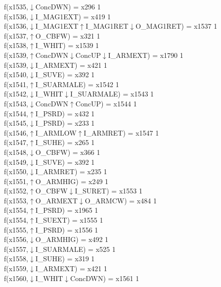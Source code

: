 f(x1535,$\downarrow$ConcDWN) = x296 {1} \\
f(x1536,$\downarrow$I\_MAG1EXT) = x419 {1} \\
f(x1536,$\downarrow$I\_MAG1EXT$\uparrow$I\_MAG1RET$\downarrow$O\_MAG1RET) = x1537 {1} \\
f(x1537,$\uparrow$O\_CBFW) = x321 {1} \\
f(x1538,$\uparrow$I\_WHIT) = x1539 {1} \\
f(x1539,$\uparrow$ConcDWN$\downarrow$ConcUP$\downarrow$I\_ARMEXT) = x1790 {1} \\
f(x1539,$\downarrow$I\_ARMEXT) = x421 {1} \\
f(x1540,$\downarrow$I\_SUVE) = x392 {1} \\
f(x1541,$\uparrow$I\_SUARMALE) = x1542 {1} \\
f(x1542,$\downarrow$I\_WHIT$\downarrow$I\_SUARMALE) = x1543 {1} \\
f(x1543,$\downarrow$ConcDWN$\uparrow$ConcUP) = x1544 {1} \\
f(x1544,$\uparrow$I\_PSRD) = x432 {1} \\
f(x1545,$\downarrow$I\_PSRD) = x233 {1} \\
f(x1546,$\uparrow$I\_ARMLOW$\uparrow$I\_ARMRET) = x1547 {1} \\
f(x1547,$\uparrow$I\_SUHE) = x265 {1} \\
f(x1548,$\downarrow$O\_CBFW) = x366 {1} \\
f(x1549,$\downarrow$I\_SUVE) = x392 {1} \\
f(x1550,$\downarrow$I\_ARMRET) = x235 {1} \\
f(x1551,$\uparrow$O\_ARMHIG) = x249 {1} \\
f(x1552,$\uparrow$O\_CBFW$\downarrow$I\_SURET) = x1553 {1} \\
f(x1553,$\uparrow$O\_ARMEXT$\downarrow$O\_ARMCW) = x484 {1} \\
f(x1554,$\uparrow$I\_PSRD) = x1965 {1} \\
f(x1554,$\uparrow$I\_SUEXT) = x1555 {1} \\
f(x1555,$\uparrow$I\_PSRD) = x1556 {1} \\
f(x1556,$\downarrow$O\_ARMHIG) = x492 {1} \\
f(x1557,$\downarrow$I\_SUARMALE) = x525 {1} \\
f(x1558,$\downarrow$I\_SUHE) = x319 {1} \\
f(x1559,$\downarrow$I\_ARMEXT) = x421 {1} \\
f(x1560,$\downarrow$I\_WHIT$\downarrow$ConcDWN) = x1561 {1} \\

